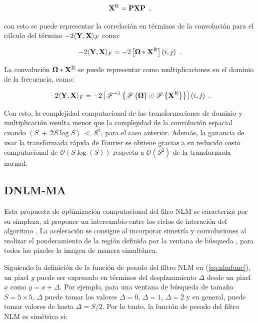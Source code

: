 \begin{equation}
\mathbf{X}^\text{R} = \mathbf{P}\mathbf{X}\mathbf{P} \enspace ,
\end{equation}



con esto se puede representar la correlaci\'on en t\'erminos de la convoluci\'on para el c\'alculo del t\'ermino $-2\langle\mathbf{Y},\mathbf{X}\rangle_{F}$ como:

\begin{equation}
-2\langle\mathbf{Y},\mathbf{X}\rangle_{F} = -2\left[\mathbf{\Omega} *\mathbf{X}^\text{R}\right](i,j) \enspace .
\end{equation}

La convoluci\'on $\mathbf{\Omega} *\mathbf{X}^\text{R}$ se puede representar como multiplicaciones en el dominio de la frecuencia, como:

\begin{equation}
-2\langle\mathbf{Y},\mathbf{X}\rangle_{F} = -2 \left[ \mathscr{F}^{-1}\left\{ \mathscr{F}\left\{\mathbf{\Omega}\right\} \odot \mathscr{F}\left\{\mathbf{X}^\text{R}\right\}\right\} \right](i,j) \enspace .
\end{equation}

Con esto, la complejidad computacional de las transformaciones de dominio y multiplicaci\'on resulta menor que la complejidad de la convoluci\'on espacial cuando $(S~+~2S\log{S})~<~S^2$, para el caso anterior. Adem\'as, la ganancia de usar la transformada r\'apida de Fourier se obtiene gracias a su reducido costo computacional de $\mathcal{O}(S\log(S))$ respecto a $\mathcal{O}(S^2)$ de la transformada normal.




\subsection{DNLM-MA}
\label{ch:marco_condat}

Esta propuesta de optimización computacional del filro NLM se caracteriza por su simpleza, al proponer un intercambio entre los ciclos de interación del algoritmo \cite{Condat2010}. La aceleración se consigue al incorporar simetría y convoluciones al realizar el ponderamiento de la región definida por la ventana de búsqueda \mat{\Omega}, para todos los pixeles la imagen de manera simultánea.

Siguiendo la definición de la función de pesado del filtro NLM en (\ref{eq:nlmfunc}), un pixel $y$ puede ser expresado en términos del desplazamiento $\Delta$ desde un pixel $x$ como $y = x + \Delta$. Por ejemplo, para una ventana de búsqueda de tama\~no $S = 5 \times 5$, $\Delta$ puede tomar los valores $\Delta=0$, $\Delta=1$, $\Delta=2$ y en general, puede tomar valores de hasta $\Delta=S/2$. Por lo tanto, la función de pesado del filtro NLM es simétrica si:

